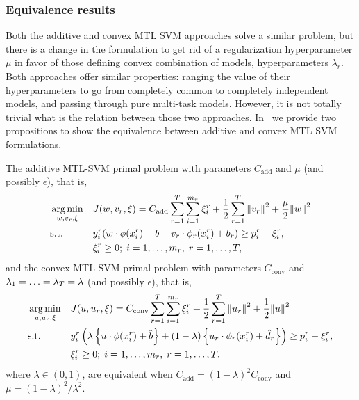\subsubsection{Equivalence results}
Both the {additive} and {convex} MTL SVM approaches solve a similar problem, but there is a change in the formulation to get rid of a regularization hyperparameter $\mu$ in favor of those defining convex combination of models, hyperparameters $\lambda_r$.
Both approaches offer similar properties: ranging the value of their hyperparameters to go from completely common to completely independent models, and passing through pure multi-task models.
However, it is not totally trivial what is the relation between those two approaches.
In~\cite{RuizAD19} we provide two propositions to show the equivalence between {additive} and {convex} MTL SVM formulations.
\begin{prop}\label{prop:add_conv_equiv}
    The {additive} MTL-SVM primal problem with parameters $C_\text{add}$ and $\mu$ (and possibly $\epsilon$), that is,
    \begin{equation}\label{eq:svmmtl_primal_add_equiv}
        \begin{aligned}
        & \argmin_{w, {v}_r, \xi}
        & & {J({w}, {v}_r, \xi) = C_\text{add} \sum_{r= 1}^T \sum_{i=1}^{m_r} {\xi_{i}^r} + \frac{1}{2} \sum_{r= 1}^T{\norm{{v}_r}^2} + \frac{\mu}{2} {\norm{{w}}}^2} \\
        & \text{s.t.}
        & & y_{i}^r ({w} \cdot \phi(x_{i}^r) + b  + {v}_r \cdot \phi_r(x_{i}^r) + b_r) \geq p_{i}^r - \xi_{i}^r ,  \\
        & & & \xi_{i}^r \geq 0; \;  i=1 , \dotsc , m_r, \;  r= 1,\dotsc, T  , \\
        \end{aligned}
    \end{equation}
    and the {convex} MTL-SVM primal problem with parameters $C_\text{conv}$ and $\lambda_1=\ldots=\lambda_T = \lambda$ (and possibly $\epsilon$), that is,
    \begin{equation}\label{eq:svmmtl_primal_convex_equiv}
        \begin{aligned}
        & \argmin_{u, {u}_r, \xi}
        & & {J({u}, {u}_r, \xi) = C_\text{conv} \sum_{r= 1}^T \sum_{i=1}^{m_r} {\xi_{i}^r} + \frac{1}{2} \sum_{r= 1}^T{\norm{{u}_r}^2} + \frac{1}{2} {\norm{{u}}}^2} \\
        & \text{s.t.}
        & & y_{i}^r \left(\lambda \left\lbrace {u} \cdot \phi(x_{i}^r) + \hat{b} \right\rbrace + (1 - \lambda) \left\lbrace {u}_r \cdot \phi_r(x_{i}^r) + \hat{d}_r \right\rbrace  \right) \geq p_{i}^r - \xi_{i}^r ,  \\
        & & & \xi_{i}^r \geq 0; \;  i=1 , \dotsc , m_r, \;  r= 1,\dotsc, T  . \\
        \end{aligned}
    \end{equation}
    where $\lambda \in (0, 1)$, are equivalent when $C_\text{add} = (1 - \lambda)^2 C_\text{conv}$ and $\mu = (1 - \lambda)^2 / \lambda^2$.
    \label{thm_equiv}
\end{prop}
